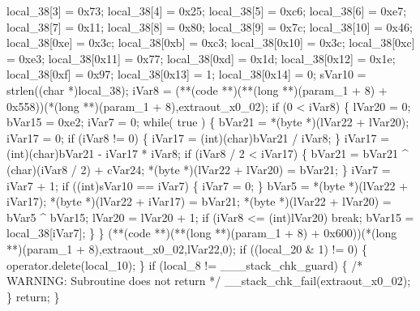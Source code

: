 \documentclass[
]{article}
\newenvironment{Shaded}{}{}
\newcommand{\NormalTok}[1]{#1}
\begin{document}
\begin{Shaded}
\begin{Highlighting}[]
\NormalTok{  local\_38[3] = 0x73;}
\NormalTok{  local\_38[4] = 0x25;}
\NormalTok{  local\_38[5] = 0xc6;}
\NormalTok{  local\_38[6] = 0xe7;}
\NormalTok{  local\_38[7] = 0x11;}
\NormalTok{  local\_38[8] = 0x80;}
\NormalTok{  local\_38[9] = 0x7c;}
\NormalTok{  local\_38[10] = 0x46;}
\NormalTok{  local\_38[0xe] = 0x3c;}
\NormalTok{  local\_38[0xb] = 0xc3;}
\NormalTok{  local\_38[0x10] = 0x3c;}
\NormalTok{  local\_38[0xc] = 0xe3;}
\NormalTok{  local\_38[0x11] = 0x77;}
\NormalTok{  local\_38[0xd] = 0x1d;}
\NormalTok{  local\_38[0x12] = 0x1e;}
\NormalTok{  local\_38[0xf] = 0x97;}
\NormalTok{  local\_38[0x13] = 1;}
\NormalTok{  local\_38[0x14] = 0;}
\NormalTok{  sVar10 = strlen((char *)local\_38);}
\NormalTok{  iVar8 = (**(code **)(**(long **)(param\_1 + 8) + 0x558))(*(long **)(param\_1 + 8),extraout\_x0\_02);}
\NormalTok{  if (0 \textless{} iVar8) \{}
\NormalTok{    lVar20 = 0;}
\NormalTok{    bVar15 = 0xe2;}
\NormalTok{    iVar7 = 0;}
\NormalTok{    while( true ) \{}
\NormalTok{      bVar21 = *(byte *)(lVar22 + lVar20);}
\NormalTok{      iVar17 = 0;}
\NormalTok{      if (iVar8 != 0) \{}
\NormalTok{        iVar17 = (int)(char)bVar21 / iVar8;}
\NormalTok{      \}}
\NormalTok{      iVar17 = (int)(char)bVar21 {-} iVar17 * iVar8;}
\NormalTok{      if (iVar8 / 2 \textless{} iVar17) \{}
\NormalTok{        bVar21 = bVar21 \^{} (char)(iVar8 / 2) + cVar24;}
\NormalTok{        *(byte *)(lVar22 + lVar20) = bVar21;}
\NormalTok{      \}}
\NormalTok{      iVar7 = iVar7 + 1;}
\NormalTok{      if ((int)sVar10 == iVar7) \{}
\NormalTok{        iVar7 = 0;}
\NormalTok{      \}}
\NormalTok{      bVar5 = *(byte *)(lVar22 + iVar17);}
\NormalTok{      *(byte *)(lVar22 + iVar17) = bVar21;}
\NormalTok{      *(byte *)(lVar22 + lVar20) = bVar5 \^{} bVar15;}
\NormalTok{      lVar20 = lVar20 + 1;}
\NormalTok{      if (iVar8 \textless{}= (int)lVar20) break;}
\NormalTok{      bVar15 = local\_38[iVar7];}
\NormalTok{    \}}
\NormalTok{  \}}
\NormalTok{  (**(code **)(**(long **)(param\_1 + 8) + 0x600))(*(long **)(param\_1 + 8),extraout\_x0\_02,lVar22,0);}
\NormalTok{  if ((local\_20 \& 1) != 0) \{}
\NormalTok{    operator.delete(local\_10);}
\NormalTok{  \}}
\NormalTok{  if (local\_8 != \_\_\_stack\_chk\_guard) \{}
\NormalTok{                    /* WARNING: Subroutine does not return */}
\NormalTok{    \_\_stack\_chk\_fail(extraout\_x0\_02);}
\NormalTok{  \}}
\NormalTok{  return;}
\NormalTok{\}}
\end{Highlighting}
\end{Shaded}
\end{document}
